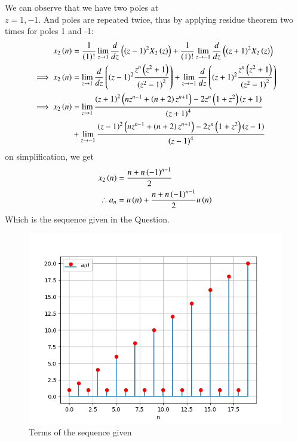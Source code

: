 \documentclass[journal,12pt,twocolumn]{IEEEtran}
\theoremstyle{remark}
\begin{document}
\newpage

We can observe that we have two poles at \\$ z= 1,-1$. And poles are repeated twice, thus by applying residue theorem two times for poles 1 and -1:
\begin{align}
    x_2\left(n\right)&=\frac{1}{\left(1\right)!}\lim\limits_{z\to 1}\frac{d}{dz}\left({(z-1)}^{2}X_2\left(z\right)\right) + \frac{1}{\left(1\right)!}\lim\limits_{z\to -1}\frac{d}{dz}\left({(z+1)}^{2}X_2\left(z\right)\right) \\
\implies    x_2\left(n\right) &=\lim\limits_{z\to 1}\frac{d}{dz}\left({(z-1)}^{2}\frac{z^n\left(z^2+1\right)}{{(z^2-1)}^2}\right)+ \lim\limits_{z\to -1}\frac{d}{dz}\left({(z+1)}^{2}\frac{z^n\left(z^2+1\right)}{{(z^2-1)}^2}\right)   \\
\notag \implies x_2\left(n\right) &= \lim\limits_{z\to 1}\frac{\left(z+1\right)^2\left(nz^{n-1}+ \left(n+2\right)z^{n+1}\right)-2z^n\left(1+z^2\right)\left(z+1\right)}{\left(z+1\right)^4}\\
    &+ \lim\limits_{z\to -1}\frac{\left(z-1\right)^2\left(nz^{n-1}+ \left(n+2\right)z^{n+1}\right)-2z^n\left(1+z^2\right)\left(z-1\right)}{\left(z-1\right)^4}
\end{align}
on simplification, we get
\begin{align}
x_2\left(n\right) &= \frac{n+n\left(-1\right)^{n-1}}{2}\\
\therefore a_n &= u\left(n\right) + \frac{n+n\left(-1\right)^{n-1}}{2} u\left(n\right)
\end{align}
Which is the sequence given in the Question.

\begin{figure}[h!]
    \includegraphics[width = \columnwidth]{figs/Figure_1.png}
    \caption{Terms of the sequence given}
    \centering
    \label{fig: nm_63_fig_2}
\end{figure}
\end{document}
